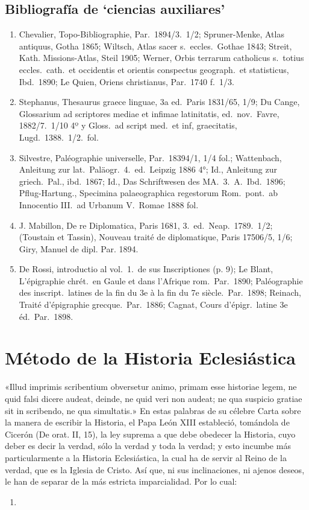 \raggedbottom{} \documentclass[12pt, a4paper]{book}
\begin{document}
\subsection{Bibliografía de `ciencias auxiliares'}
\begin{enumerate}
  \item Chevalier, Topo-Bibliographie, Par.\ 1894/3.\ 1/2; Spruner-Menke, Atlas antiquus, Gotha 1865; Wiltsch, Atlas sacer s.\ eccles.\ Gothae 1843; Streit, Kath. Missions-Atlas, Steil 1905; Werner, Orbis terrarum catholicus s.\ totius eccles.\ cath.\ et occidentis et orientis conspectus geograph.\ et statisticus, Ibd.\ 1890; Le Quien, Oriens christianus, Par.\ 1740 f.\ 1/3.
  \item Stephanus, Thesaurus graece linguae, 3a ed.\ Paris 1831/65, 1/9; Du Cange, Glossarium ad scriptores mediae et infimae latinitatis, ed.\ nov.\ Favre, 1882/7.\ 1/10 4º y Gloss.\ ad script med.\ et inf, graecitatis, Lugd.\ 1388.\ 1/2.\ fol.\
  \item Silvestre, Paléographie universelle, Par.\ 18394/1, 1/4 fol.; Wattenbach, Anleitung zur lat.\ Paläogr.\ 4.\ ed.\ Leipzig 1886 4°; Id., Anleitung zur griech.\ Pal., ibd.\ 1867; Id., Das Schriftwesen des MA.\ 3.\ A.\ Ibd.\ 1896; Pflug-Hartung., Specimina palaeographica regestorum Rom.\ pont.\ ab Innocentio III.\ ad Urbanum V.\ Romae 1888 fol.
  \item J. Mabillon, De re Diplomatica, Paris 1681, 3.\ ed.\ Neap.\ 1789.\ 1/2; (Toustain et Tassin), Nouveau traité de diplomatique, Paris 17506/5, 1/6; Giry, Manuel de dipl. Par. 1894.
  \item De Rossi, introductio al vol.\ 1.\ de sus Inscriptiones (p. 9); Le Blant, L'épigraphie chrét.\ en Gaule et dans l'Afrique rom.\ Par.\ 1890; Paléographie des inscript.\ latines de la fin du 3e à la fin du 7e siècle.\ Par.\ 1898; Reinach, Traité d'épigraphie grecque.\ Par.\ 1886; Cagnat, Cours d'épigr.\ latine 3e éd.\ Par.\ 1898.
\end{enumerate}
\section{Método de la Historia Eclesiástica}
«Illud imprimis scribentium obversetur animo, primam esse
historiae legem, ne quid falsi dicere audeat, deinde, ne quid veri
non audeat; ne qua suspicio gratiae sit in scribendo, ne qua
simultatis.» En estas palabras de su célebre Carta sobre la manera
de escribir la Historia, el Papa León XIII estableció, tomándola de
Cicerón (De orat. II, 15), la ley suprema a que debe obedecer la Historia, cuyo deber es decir la verdad, sólo la verdad y toda la verdad;
y esto incumbe más particularmente a la Historia Eclesiástica, la cual
ha de servir al Reino de la verdad, que es la Iglesia de Cristo. Así
que, ni sus inclinaciones, ni ajenos deseos, le han de separar de la
más estricta imparcialidad. Por lo cual:
\begin{enumerate}
  \item
\end{enumerate}
\end{document}
